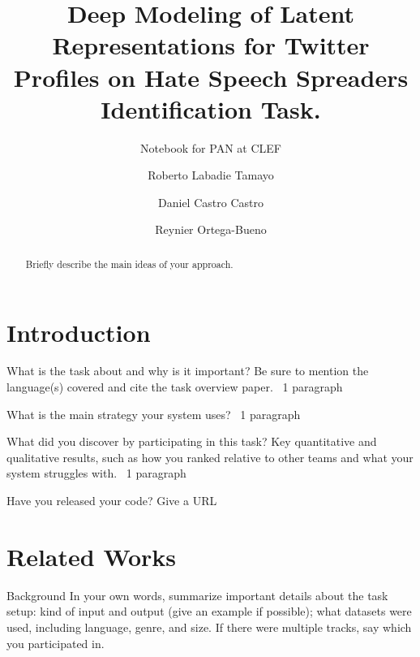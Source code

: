 \documentclass{llncs}
\begin{document}
	

\title{Deep Modeling of Latent Representations for Twitter Profiles on Hate Speech Spreaders Identification Task.}
\subtitle{Notebook for PAN at CLEF \the\year}

\author{Roberto Labadie Tamayo \and Daniel Castro Castro \and Reynier Ortega-Bueno }

\maketitle

\begin{abstract}
Briefly describe the main ideas of your approach.
\end{abstract}


\section{Introduction}
What is the task about and why is it important? Be sure to mention the language(s) covered and cite the task overview paper. ~1 paragraph

What is the main strategy your system uses? ~1 paragraph

What did you discover by participating in this task? Key quantitative and qualitative results, such as how you ranked relative to other teams and what your system struggles with. ~1 paragraph

Have you released your code? Give a URL
\section{Related Works}

Background
In your own words, summarize important details about the task setup: kind of input and output (give an example if possible); what datasets were used, including language, genre, and size. If there were multiple tracks, say which you participated in.
\end{document}
